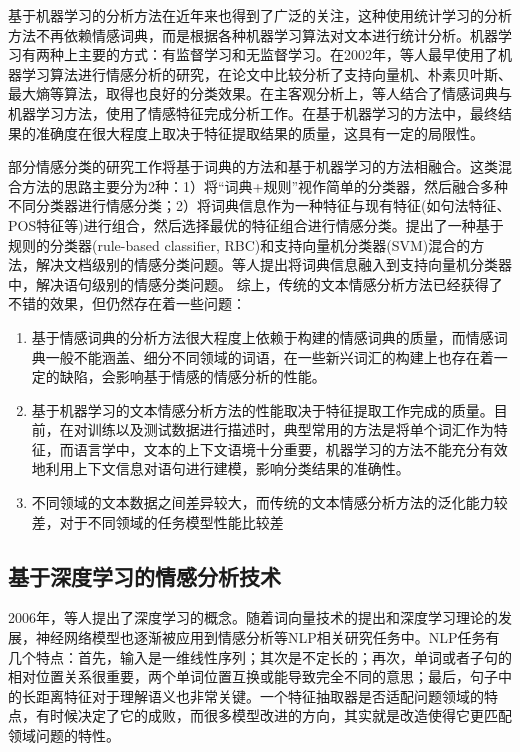 \documentclass{clv3}
\begin{document}
基于机器学习的分析方法在近年来也得到了广泛的关注，这种使用统计学习的分析方法不再依赖情感词典，而是根据各种机器学习算法对文本进行统计分析。机器学习有两种上主要的方式：有监督学习和无监督学习。在2002年，\cite{pang}等人最早使用了机器学习算法进行情感分析的研究，在论文中比较分析了支持向量机、朴素贝叶斯、最大熵等算法，取得也良好的分类效果。在主客观分析上，\cite{mali}等人结合了情感词典与机器学习方法，使用了情感特征完成分析工作。在基于机器学习的方法中，最终结果的准确度在很大程度上取决于特征提取结果的质量，这具有一定的局限性。

部分情感分类的研究工作将基于词典的方法和基于机器学习的方法相融合。这类混合方法的思路主要分为2种：1）将“词典+规则”视作简单的分类器，然后融合多种不同分类器进行情感分类；2）将词典信息作为一种特征与现有特征(如句法特征、POS特征等)进行组合，然后选择最优的特征组合进行情感分类。\cite{prabowo}提出了一种基于规则的分类器(rule-based classifier, RBC)和支持向量机分类器(SVM)混合的方法，解决文档级别的情感分类问题。\cite{fang}等人提出将词典信息融入到支持向量机分类器中，解决语句级别的情感分类问题。
综上，传统的文本情感分析方法已经获得了不错的效果，但仍然存在着一些问题：
\begin{enumerate}[(1)]
	\item 基于情感词典的分析方法很大程度上依赖于构建的情感词典的质量，而情感词典一般不能涵盖、细分不同领域的词语，在一些新兴词汇的构建上也存在着一定的缺陷，会影响基于情感的情感分析的性能。

	\item 基于机器学习的文本情感分析方法的性能取决于特征提取工作完成的质量。目前，在对训练以及测试数据进行描述时，典型常用的方法是将单个词汇作为特征，而语言学中，文本的上下文语境十分重要，机器学习的方法不能充分有效地利用上下文信息对语句进行建模，影响分类结果的准确性。

	\item 不同领域的文本数据之间差异较大，而传统的文本情感分析方法的泛化能力较差，对于不同领域的任务模型性能比较差
\end{enumerate}


\subsection{基于深度学习的情感分析技术}
2006年，\cite{hinton}等人提出了深度学习的概念。随着词向量技术的提出和深度学习理论的发展，神经网络模型也逐渐被应用到情感分析等NLP相关研究任务中。NLP任务有几个特点：首先，输入是一维线性序列；其次是不定长的；再次，单词或者子句的相对位置关系很重要，两个单词位置互换或能导致完全不同的意思；最后，句子中的长距离特征对于理解语义也非常关键。一个特征抽取器是否适配问题领域的特点，有时候决定了它的成败，而很多模型改进的方向，其实就是改造使得它更匹配领域问题的特性。
\end{document}
